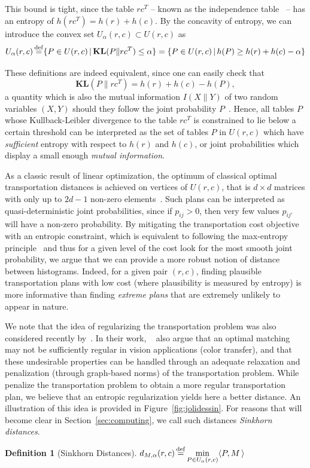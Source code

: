 \documentclass{amsart} %
\newtheorem{definition}{Definition}
\def\KL{\mathbf{KL}}
\begin{document}
This bound is tight, since the table $rc^T$ -- known as the independence table~\citep{good1963maximum} -- has an entropy of $h(rc^T)=h(r)+h(c)$. By the concavity of entropy, we can introduce the convex set $U_\alpha(r,c)\subset U(r,c)$ as
$$U_\alpha(r,c)\defeq \{P\in U(r,c)\,|\,\KL(P\|rc^T)\leq \alpha \} = \{P\in U(r,c)\,|\, h(P)\geq h(r)+h(c)-\alpha\}$$

These definitions are indeed equivalent, since one can easily check that 
$$\KL(P\|rc^T)= h(r)+h(c)-h(P),$$ a quantity which is also the mutual information $I(X\|Y)$ of two random variables $(X,Y)$ should they follow the joint probability $P$~\cite[\S2]{cover91elements}. Hence, all tables $P$ whose Kullback-Leibler divergence to the table $rc^T$ is constrained to lie below a certain threshold can be interpreted as the set of tables $P$ in $U(r,c)$ which have \emph{sufficient} entropy with respect to $h(r)$ and $h(c)$, or joint probabilities which display a small enough \emph{mutual information}.

As a classic result of linear optimization, the optimum of classical optimal transportation distances is achieved on vertices of $U(r,c)$, that is $d\times d$ matrices with only up to $2d-1$ non-zero elements~\citep[\S8.1.3]{brualdi2006combinatorial}. Such plans can be interpreted as quasi-deterministic joint probabilities, since if $p_{ij}>0$, then very few values $p_{ij'}$ will have a non-zero probability. By mitigating the transportation cost objective with an entropic constraint, which is equivalent to following the max-entropy principle~\citep{PhysRev.106.620,dudik2006maximum} and thus for a given level of the cost look for the most smooth joint probability, we argue that we can provide a more robust notion of distance between histograms. Indeed, for a given pair $(r,c)$, finding plausible transportation plans with low cost (where plausibility is measured by entropy) is more informative than finding \emph{extreme plans} that are extremely unlikely to appear in nature.

We note that the idea of regularizing the transportation problem was also considered recently by~\citet{ferradans2013regularized}. In their work, ~\citeauthor{ferradans2013regularized} also argue that an optimal matching may not be sufficiently regular in vision applications (color transfer), and that these undesirable properties can be handled through an adequate relaxation and penalization (through graph-based norms) of the transportation problem. While~\citet{ferradans2013regularized} penalize the transportation problem to obtain a more regular transportation plan, we believe that an entropic regularization yields here a better distance. An illustration of this idea is provided in Figure~\ref{fig:jolidessin}.  For reasons that will become clear in Section~\ref{sec:computing}, we call such distances \emph{Sinkhorn distances}.
\begin{definition}[Sinkhorn Distances]\label{def:sinkhorn} $\displaystyle d_{M,\alpha}(r,c)\operatorname{\overset{\operatorname{def}}{=}}\min_{P\in U_\alpha(r,c)}\langle P , M\,\rangle$
\end{definition}
\end{document}
